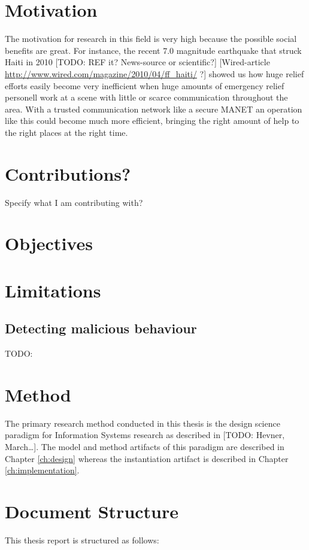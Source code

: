 \section{Motivation}
The motivation for research in this field is very high because the possible
social benefits are great. For instance, the recent 7.0 magnitude earthquake
that struck Haiti in 2010 [TODO: REF it? News-source or scientific?]
[Wired-article \url{http://www.wired.com/magazine/2010/04/ff_haiti/} ?] showed
us how huge relief efforts easily become very inefficient when huge amounts of
emergency relief personell work at a scene with little or scarce communication
throughout the area. With a trusted communication network like a secure
\ac{MANET} an operation like this could become much more efficient, bringing the
right amount of help to the right places at the right time.

\section{Contributions?}
Specify what I am contributing with?

\section{Objectives}

\section{Limitations}

\subsection{Detecting malicious behaviour}
\label{limit:malicious_behaviour}
TODO:

\section{Method}
The primary research method conducted in this thesis is the design science
paradigm for Information Systems research as described in [TODO: Hevner,
March\ldots]. The model and method artifacts of this paradigm are described in
Chapter \ref{ch:design} whereas the instantiation artifact is described in
Chapter \ref{ch:implementation}.

\section{Document Structure}
This thesis report is structured as follows:

